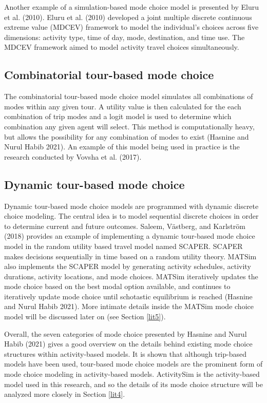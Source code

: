 \documentclass[12pt, oneside, openright]{byuthesis}
\begin{document}
Another example of a simulation-based mode choice model is presented by Eluru et al. (2010). Eluru et al. (2010) developed a joint multiple discrete continuous extreme value (MDCEV) framework to model the individual's choices across five dimensions: activity type, time of day, mode, destination, and time use. The MDCEV framework aimed to model activity travel choices simultaneously.

\hypertarget{lit36}{%
\subsection{Combinatorial tour-based mode choice}\label{lit36}}

The combinatorial tour-based mode choice model simulates all combinations of modes within any given tour. A utility value is then calculated for the each combination of trip modes and a logit model is used to determine which combination any given agent will select. This method is computationally heavy, but allows the possibility for any combination of modes to exist (Hasnine and Nurul Habib 2021). An example of this model being used in practice is the research conducted by Vovsha et al. (2017).

\hypertarget{lit37}{%
\subsection{Dynamic tour-based mode choice}\label{lit37}}

Dynamic tour-based mode choice models are programmed with dynamic discrete choice modeling. The central idea is to model sequential discrete choices in order to determine current and future outcomes. Saleem, Västberg, and Karlström (2018) provides an example of implementing a dynamic tour-based mode choice model in the random utility based travel model named SCAPER. SCAPER makes decisions sequentially in time based on a random utility theory. MATSim also implements the SCAPER model by generating activity schedules, activity durations, activity locations, and mode choices. MATSim iteratively updates the mode choice based on the best modal option available, and continues to iteratively update mode choice until schotastic equilibrium is reached (Hasnine and Nurul Habib 2021). More intimate details inside the MATSim mode choice model will be discussed later on (see Section \ref{lit5}).

Overall, the seven categories of mode choice presented by Hasnine and Nurul Habib (2021) gives a good overview on the details behind existing mode choice structures within activity-based models. It is shown that although trip-based models have been used, tour-based mode choice models are the prominent form of mode choice modeling in activity-based models. ActivitySim is the activity-based model used in this research, and so the details of its mode choice structure will be analyzed more closely in Section \ref{lit4}.
\end{document}
